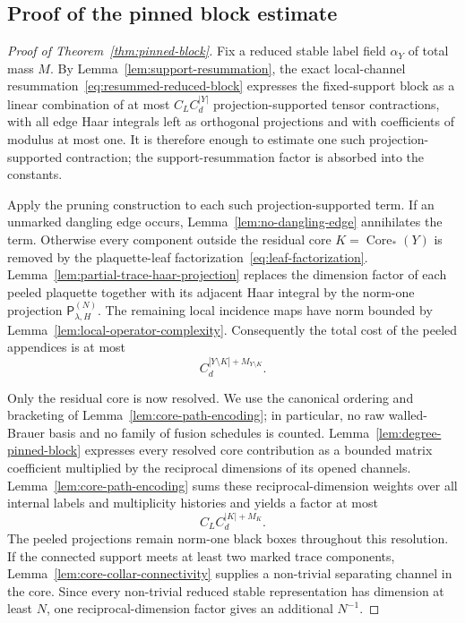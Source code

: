 \documentclass[11pt,a4paper,reqno]{amsart}
\theoremstyle{definition}
\theoremstyle{remark}
\begin{document}
\subsection{Proof of the pinned block estimate}


\begin{proof}[Proof of Theorem~\ref{thm:pinned-block}]
Fix a reduced stable label field $\alpha_Y$ of total mass $M$.  By Lemma~\ref{lem:support-resummation}, the exact local-channel resummation~\eqref{eq:resummed-reduced-block} expresses the fixed-support block as a linear combination of at most $C_LC_d^{|Y|}$ projection-supported tensor contractions, with all edge Haar integrals left as orthogonal projections and with coefficients of modulus at most one.  It is therefore enough to estimate one such projection-supported contraction; the support-resummation factor is absorbed into the constants.

Apply the pruning construction to each such projection-supported term.  If an unmarked dangling edge occurs, Lemma~\ref{lem:no-dangling-edge} annihilates the term.  Otherwise every component outside the residual core $K=\operatorname{Core}_*(Y)$ is removed by the plaquette-leaf factorization~\eqref{eq:leaf-factorization}.  Lemma~\ref{lem:partial-trace-haar-projection} replaces the dimension factor of each peeled plaquette together with its adjacent Haar integral by the norm-one projection
$\mathsf P_{\lambda,H}^{(N)}$.  The remaining local incidence maps have norm bounded by Lemma~\ref{lem:local-operator-complexity}.  Consequently the total cost of the peeled appendices is at most
\[
C_d^{|Y\setminus K|+M_{Y\setminus K}}.
\]

Only the residual core is now resolved.  We use the canonical ordering and bracketing of Lemma~\ref{lem:core-path-encoding}; in particular, no raw walled-Brauer basis and no family of fusion schedules is counted.  Lemma~\ref{lem:degree-pinned-block} expresses every resolved core contribution as a bounded matrix coefficient multiplied by the reciprocal dimensions of its opened channels.  Lemma~\ref{lem:core-path-encoding} sums these reciprocal-dimension weights over all internal labels and multiplicity histories and yields a factor at most
\[
C_LC_d^{|K|+M_K}.
\]
The peeled projections remain norm-one black boxes throughout this resolution.  If the connected support meets at least two marked trace components, Lemma~\ref{lem:core-collar-connectivity} supplies a non-trivial separating channel in the core.  Since every non-trivial reduced stable representation has dimension at least $N$, one reciprocal-dimension factor gives an additional $N^{-1}$.


\end{proof}
\end{document}
